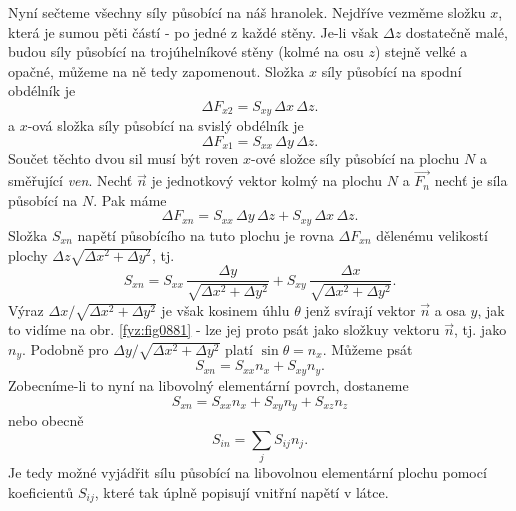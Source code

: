 {    Nyní sečteme všechny síly působící na náš hranolek. Nejdříve vezměme složku \(x\), která je
    sumou pěti částí - po jedné z každé stěny. Je-li však \(Δz\) dostatečně malé, budou síly
    působící na trojúhelníkové stěny (kolmé na osu \(z\)) stejně velké a opačné, můžeme na ně tedy
    zapomenout. Složka \(x\) síly působící na spodní obdélník je
    \begin{equation*}
      \Delta F_{x2}=S_{xy}\,\Delta x\,\Delta z.
    \end{equation*}
    a \(x\)-ová složka síly působící na svislý obdélník je
    \begin{equation*}
      \Delta F_{x1}=S_{xx}\,\Delta y\,\Delta z.
    \end{equation*}
    Součet těchto dvou sil musí být roven \(x\)-ové složce síly působící na plochu \(N\) a směřující
    \emph{ven}. Nechť \(\vec{n}\) je jednotkový vektor kolmý na plochu \(N\) a \(\vec{F_n}\) nechť
    je síla působící na \(N\). Pak máme
    \begin{equation*}
      \Delta F_{xn}=S_{xx}\,\Delta y\,\Delta z+S_{xy}\,\Delta x\,\Delta z.
    \end{equation*}
    Složka \(S_{xn}\) napětí působícího na tuto plochu je rovna \(\Delta F_{xn}\) dělenému velikostí
    plochy \(\Delta z\sqrt{\Delta x^2+\Delta y^2}\), tj.
    \begin{equation*}
      S_{xn}=S_{xx}\,\frac{\Delta y}{\sqrt{\Delta x^2+\Delta y^2}}+
      S_{xy}\,\frac{\Delta x}{\sqrt{\Delta x^2+\Delta y^2}}.
    \end{equation*}
    Výraz \(\Delta x/\sqrt{\Delta x^2+\Delta y^2}\) je však kosinem úhlu \(\theta\) jenž svírají
    vektor \(\vec{n}\) a osa \(y\), jak to vidíme na obr. \ref{fyz:fig0881} - lze jej proto psát jako
    složkuy vektoru \(\vec{n}\), tj. jako \(n_y\). Podobně pro \(\Delta y/\sqrt{\Delta x^2+\Delta
    y^2}\) platí \(\sin\theta=n_x\). Můžeme psát
    \begin{equation*}
      S_{xn}=S_{xx}n_x+S_{xy}n_y.
    \end{equation*}
    Zobecníme-li to nyní na libovolný elementární povrch, dostaneme
    \begin{equation*}
      S_{xn}=S_{xx}n_x+S_{xy}n_y+S_{xz}n_z
    \end{equation*}
    nebo obecně
    \begin{equation}\label{fyz:eq952}
      S_{in}=\sum_jS_{ij}n_j.
    \end{equation} 
    Je tedy možné vyjádřit sílu působící na libovolnou elementární plochu pomocí koeficientů
    \(S_{ij}\), které tak úplně popisují vnitřní napětí v látce.

}
